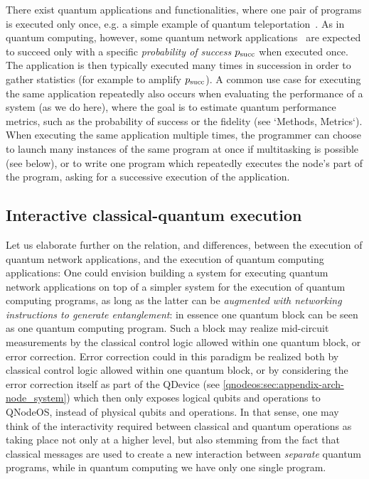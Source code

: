 There exist quantum applications and functionalities, where one pair of programs is executed only once, e.g. a simple example of quantum teleportation~\cite{bennett_1993_teleportation}. As in quantum computing, however, some quantum network applications~\cite{wehner_2018_stages} are expected to succeed only with a specific \emph{probability of success} $p_{\rm succ}$ when executed once. The application is then typically executed many times in succession in order to gather statistics (for example to amplify $p_{\rm succ}$). A common use case for executing the same application repeatedly also occurs when evaluating the performance of a system (as we do here), where the goal is to estimate quantum performance metrics, such as the probability of success or the fidelity (see `Methods, Metrics`).
When executing the same application multiple times, the programmer can choose to launch many instances of the same program at once if multitasking is possible (see below), or to write one program which repeatedly executes the node's part of the program, asking for a successive execution of the application.

\subsection{Interactive classical-quantum execution}

Let us elaborate further on the relation, and differences, between the execution of quantum network applications, and the execution of quantum computing applications: One could envision building a system for executing quantum network applications on top of a simpler system for the execution of quantum computing programs, as long as the latter can be \emph{augmented with networking instructions to generate entanglement}: in essence one quantum block can be seen as one quantum computing program. Such a block may realize mid-circuit measurements by the classical control logic allowed within one quantum block, or error correction. Error correction could in this paradigm be realized both by classical control logic allowed within one quantum block, or by considering the error correction itself as part of the \ac{QDevice} (see \cref{qnodeos:sec:appendix-arch-node_system}) which then only exposes logical qubits and operations to \ac{QNodeOS}, instead of physical qubits and operations. In that sense, one may think of the interactivity required between classical and quantum operations as taking place not only at a higher level, but also stemming from the fact that classical messages are used to create a new interaction between \emph{separate} quantum programs, while in quantum computing we have only one single program.

